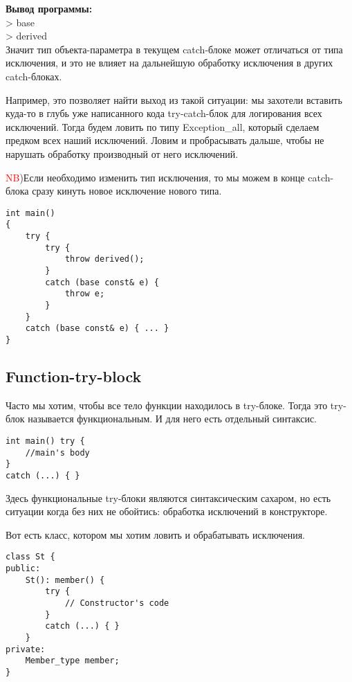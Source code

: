 \textbf{Вывод программы:} \\
> base \\
> derived \\

Значит тип объекта-параметра в текущем catch-блоке может отличаться от типа исключения, и это не влияет на дальнейшую обработку исключения в других catch-блоках.

 Например, это позволяет найти выход из такой ситуации: мы захотели вставить куда-то в глубь уже написанного кода try-catch-блок для логирования всех исключений. Тогда будем ловить по типу Exception\_all, который сделаем предком всех наший исключений. Ловим и пробрасывать дальше, чтобы не нарушать обработку производный от него исключений.

 \textcolor{red}{NB})Если необходимо изменить тип исключения, то мы можем в конце catch-блока сразу кинуть новое исключение нового типа. 

\begin{verbatim}
int main()
{
    try {
        try {
            throw derived();
        }
        catch (base const& e) {
            throw e;
        }
    }
    catch (base const& e) { ... }
}
\end{verbatim}

\subsection{Function-try-block}

Часто мы хотим, чтобы все тело функции находилось в try-блоке. Тогда это try-блок называется функциональным. И для него есть отдельный синтаксис.
\begin{verbatim}
int main() try {
    //main's body
}
catch (...) { }
\end{verbatim}

Здесь функциональные try-блоки являются синтаксическим сахаром, но есть ситуации когда без них не обойтись: обработка исключений в конструкторе.

Вот есть класс, котором мы хотим ловить и обрабатывать исключения.
\begin{verbatim}
class St {
public:
    St(): member() {
        try {
            // Constructor's code
        }
        catch (...) { }
    }
private:
    Member_type member;
}
\end{verbatim}

